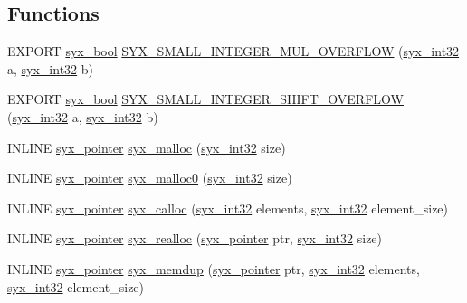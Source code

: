 \subsection*{Functions}
\begin{CompactItemize}
\item 
EXPORT \hyperlink{syx-types_8h_c6dc09b276b99fa1956364359139daab}{syx\_\-bool} \hyperlink{syx-types_8h_22b049e1ad0335e6870a1dbb7376980d}{SYX\_\-SMALL\_\-INTEGER\_\-MUL\_\-OVERFLOW} (\hyperlink{syx-types_8h_9f31c17555a2dfcf25da84b5c4a2e55b}{syx\_\-int32} a, \hyperlink{syx-types_8h_9f31c17555a2dfcf25da84b5c4a2e55b}{syx\_\-int32} b)
\item 
EXPORT \hyperlink{syx-types_8h_c6dc09b276b99fa1956364359139daab}{syx\_\-bool} \hyperlink{syx-types_8h_a74d34881c9ff57dcaee88b24a2868fb}{SYX\_\-SMALL\_\-INTEGER\_\-SHIFT\_\-OVERFLOW} (\hyperlink{syx-types_8h_9f31c17555a2dfcf25da84b5c4a2e55b}{syx\_\-int32} a, \hyperlink{syx-types_8h_9f31c17555a2dfcf25da84b5c4a2e55b}{syx\_\-int32} b)
\item 
INLINE \hyperlink{syx-types_8h_51c518ab1f082eb4330ca143afb1584f}{syx\_\-pointer} \hyperlink{syx-types_8h_7446426502808204156e54c87ac180bf}{syx\_\-malloc} (\hyperlink{syx-types_8h_9f31c17555a2dfcf25da84b5c4a2e55b}{syx\_\-int32} size)
\item 
INLINE \hyperlink{syx-types_8h_51c518ab1f082eb4330ca143afb1584f}{syx\_\-pointer} \hyperlink{syx-types_8h_d3289765fe9f49b5fcc601baa1dc2757}{syx\_\-malloc0} (\hyperlink{syx-types_8h_9f31c17555a2dfcf25da84b5c4a2e55b}{syx\_\-int32} size)
\item 
INLINE \hyperlink{syx-types_8h_51c518ab1f082eb4330ca143afb1584f}{syx\_\-pointer} \hyperlink{syx-types_8h_0a7e373cdf0766342290aa127715542a}{syx\_\-calloc} (\hyperlink{syx-types_8h_9f31c17555a2dfcf25da84b5c4a2e55b}{syx\_\-int32} elements, \hyperlink{syx-types_8h_9f31c17555a2dfcf25da84b5c4a2e55b}{syx\_\-int32} element\_\-size)
\item 
INLINE \hyperlink{syx-types_8h_51c518ab1f082eb4330ca143afb1584f}{syx\_\-pointer} \hyperlink{syx-types_8h_ee5c4c5cdd6c2b10174a78548375f1fe}{syx\_\-realloc} (\hyperlink{syx-types_8h_51c518ab1f082eb4330ca143afb1584f}{syx\_\-pointer} ptr, \hyperlink{syx-types_8h_9f31c17555a2dfcf25da84b5c4a2e55b}{syx\_\-int32} size)
\item 
INLINE \hyperlink{syx-types_8h_51c518ab1f082eb4330ca143afb1584f}{syx\_\-pointer} \hyperlink{syx-types_8h_47f29ccdb2ad4cdc7664fcc6ecaf2519}{syx\_\-memdup} (\hyperlink{syx-types_8h_51c518ab1f082eb4330ca143afb1584f}{syx\_\-pointer} ptr, \hyperlink{syx-types_8h_9f31c17555a2dfcf25da84b5c4a2e55b}{syx\_\-int32} elements, \hyperlink{syx-types_8h_9f31c17555a2dfcf25da84b5c4a2e55b}{syx\_\-int32} element\_\-size)

\end{CompactItemize}
